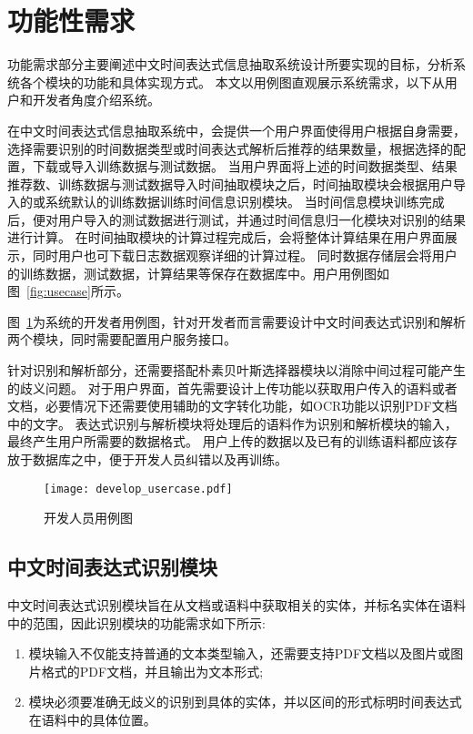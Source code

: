 \section{功能性需求}

功能需求部分主要阐述中文时间表达式信息抽取系统设计所要实现的目标，分析系统各个模块的功能和具体实现方式。
本文以用例图直观展示系统需求，以下从用户和开发者角度介绍系统。

在中文时间表达式信息抽取系统中，会提供一个用户界面使得用户根据自身需要，选择需要识别的时间数据类型或时间表达式解析后推荐的结果数量，根据选择的配置，下载或导入训练数据与测试数据。
当用户界面将上述的时间数据类型、结果推荐数、训练数据与测试数据导入时间抽取模块之后，时间抽取模块会根据用户导入的或系统默认的训练数据训练时间信息识别模块。
当时间信息模块训练完成后，便对用户导入的测试数据进行测试，并通过时间信息归一化模块对识别的结果进行计算。
在时间抽取模块的计算过程完成后，会将整体计算结果在用户界面展示，同时用户也可下载日志数据观察详细的计算过程。
同时数据存储层会将用户的训练数据，测试数据，计算结果等保存在数据库中。用户用例图如图~\ref{fig:usecase}所示。

图~\ref{fig:develope_usecase}为系统的开发者用例图，针对开发者而言需要设计中文时间表达式识别和解析两个模块，同时需要配置用户服务接口。

针对识别和解析部分，还需要搭配朴素贝叶斯选择器模块以消除中间过程可能产生的歧义问题。
对于用户界面，首先需要设计上传功能以获取用户传入的语料或者文档，必要情况下还需要使用辅助的文字转化功能，如OCR功能以识别PDF文档中的文字。
表达式识别与解析模块将处理后的语料作为识别和解析模块的输入，最终产生用户所需要的数据格式。
用户上传的数据以及已有的训练语料都应该存放于数据库之中，便于开发人员纠错以及再训练。

\begin{figure}[t]
    \centering
    \texttt{[image: develop\_usercase.pdf]}
    \caption{开发人员用例图}
    \label{fig:develope_usecase}
\end{figure}

\subsection{中文时间表达式识别模块}

中文时间表达式识别模块旨在从文档或语料中获取相关的实体，并标名实体在语料中的范围，因此识别模块的功能需求如下所示:
\begin{enumerate}
    \item[(1)] 模块输入不仅能支持普通的文本类型输入，还需要支持PDF文档以及图片或图片格式的PDF文档，并且输出为文本形式;
    \item[(2)] 模块必须要准确无歧义的识别到具体的实体，并以区间的形式标明时间表达式在语料中的具体位置。
\end{enumerate}

